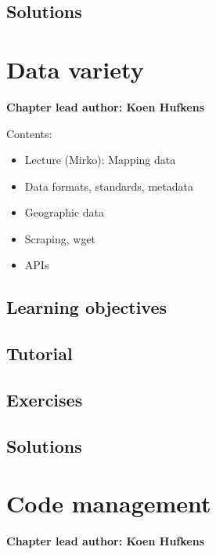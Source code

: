 \documentclass[
]{book}
\providecommand{\tightlist}{%
  \setlength{\itemsep}{0pt}\setlength{\parskip}{0pt}}
\begin{document}
\hypertarget{solutions-3}{%
\section{Solutions}\label{solutions-3}}

\hypertarget{data_variety}{%
\chapter{Data variety}\label{data_variety}}

\textbf{Chapter lead author: Koen Hufkens}

Contents:

\begin{itemize}
\tightlist
\item
  Lecture (Mirko): Mapping data
\item
  Data formats, standards, metadata
\item
  Geographic data
\item
  Scraping, wget
\item
  APIs
\end{itemize}

\hypertarget{learning-objectives-4}{%
\section{Learning objectives}\label{learning-objectives-4}}

\hypertarget{tutorial-4}{%
\section{Tutorial}\label{tutorial-4}}

\hypertarget{exercises-4}{%
\section{Exercises}\label{exercises-4}}

\hypertarget{solutions-4}{%
\section{Solutions}\label{solutions-4}}

\hypertarget{code_mgmt}{%
\chapter{Code management}\label{code_mgmt}}

\textbf{Chapter lead author: Koen Hufkens}
\end{document}
